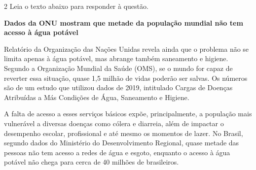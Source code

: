 \num{2} Leia o texto abaixo para responder à questão. 

\begin{myquote}



\textbf{Dados da ONU mostram que metade da população mundial não tem acesso à água potável}

Relatório da Organização das Nações Unidas revela ainda que o problema não se
limita apenas à água potável, mas abrange também saneamento e higiene. Segundo
a Organização Mundial da Saúde (OMS), se o mundo for capaz de reverter essa
situação, quase 1,5 milhão de vidas poderão ser salvas. Os números são de um
estudo que utilizou dados de 2019, intitulado Cargas de Doenças Atribuídas a
Más Condições de Água, Saneamento e Higiene.

A falta de acesso a esses serviços básicos expõe, principalmente, a população
mais vulnerável a diversas doenças como cólera e diarreia, além de impactar o
desempenho escolar, profissional e até mesmo os momentos de lazer. No Brasil,
segundo dados do Ministério do Desenvolvimento Regional, quase metade das
pessoas não tem acesso a redes de água e esgoto, enquanto o acesso à água
potável não chega para cerca de 40 milhões de brasileiros.


\end{myquote}

\pagebreak

